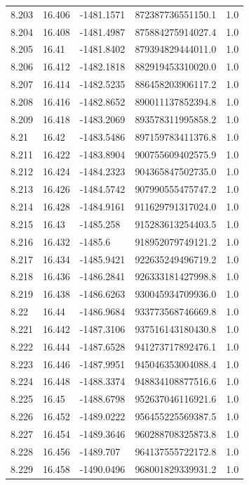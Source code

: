 \begin{tabular}{lllll}
8.203 & 16.406 & -1481.1571 & 872387736551150.1 & 1.0 \\
8.204 & 16.408 & -1481.4987 & 875884275914027.4 & 1.0 \\
8.205 & 16.41 & -1481.8402 & 879394829444011.0 & 1.0 \\
8.206 & 16.412 & -1482.1818 & 882919453310020.0 & 1.0 \\
8.207 & 16.414 & -1482.5235 & 886458203906117.2 & 1.0 \\
8.208 & 16.416 & -1482.8652 & 890011137852394.8 & 1.0 \\
8.209 & 16.418 & -1483.2069 & 893578311995858.2 & 1.0 \\
8.21 & 16.42 & -1483.5486 & 897159783411376.8 & 1.0 \\
8.211 & 16.422 & -1483.8904 & 900755609402575.9 & 1.0 \\
8.212 & 16.424 & -1484.2323 & 904365847502735.0 & 1.0 \\
8.213 & 16.426 & -1484.5742 & 907990555475747.2 & 1.0 \\
8.214 & 16.428 & -1484.9161 & 911629791317024.0 & 1.0 \\
8.215 & 16.43 & -1485.258 & 915283613254403.5 & 1.0 \\
8.216 & 16.432 & -1485.6 & 918952079749121.2 & 1.0 \\
8.217 & 16.434 & -1485.9421 & 922635249496719.2 & 1.0 \\
8.218 & 16.436 & -1486.2841 & 926333181427998.8 & 1.0 \\
8.219 & 16.438 & -1486.6263 & 930045934709936.0 & 1.0 \\
8.22 & 16.44 & -1486.9684 & 933773568746669.8 & 1.0 \\
8.221 & 16.442 & -1487.3106 & 937516143180430.8 & 1.0 \\
8.222 & 16.444 & -1487.6528 & 941273717892476.1 & 1.0 \\
8.223 & 16.446 & -1487.9951 & 945046353004088.4 & 1.0 \\
8.224 & 16.448 & -1488.3374 & 948834108877516.6 & 1.0 \\
8.225 & 16.45 & -1488.6798 & 952637046116921.6 & 1.0 \\
8.226 & 16.452 & -1489.0222 & 956455225569387.5 & 1.0 \\
8.227 & 16.454 & -1489.3646 & 960288708325873.8 & 1.0 \\
8.228 & 16.456 & -1489.707 & 964137555722172.8 & 1.0 \\
8.229 & 16.458 & -1490.0496 & 968001829339931.2 & 1.0 \\

\end{tabular}
